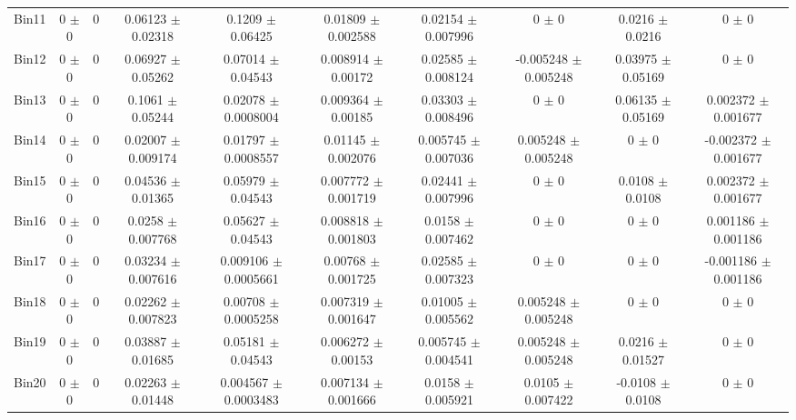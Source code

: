 \begin{tabular}{@{\extracolsep{4pt}}lccccccccc@{}}
     Bin11 & 0 $\pm$ 0 & 0 & 0.06123 $\pm$ 0.02318 & 0.1209 $\pm$ 0.06425 & 0.01809 $\pm$ 0.002588 & 0.02154 $\pm$ 0.007996 & 0 $\pm$ 0 & 0.0216 $\pm$ 0.0216 & 0 $\pm$ 0 \\ 
     Bin12 & 0 $\pm$ 0 & 0 & 0.06927 $\pm$ 0.05262 & 0.07014 $\pm$ 0.04543 & 0.008914 $\pm$ 0.00172 & 0.02585 $\pm$ 0.008124 & -0.005248 $\pm$ 0.005248 & 0.03975 $\pm$ 0.05169 & 0 $\pm$ 0 \\ 
     Bin13 & 0 $\pm$ 0 & 0 & 0.1061 $\pm$ 0.05244 & 0.02078 $\pm$ 0.0008004 & 0.009364 $\pm$ 0.00185 & 0.03303 $\pm$ 0.008496 & 0 $\pm$ 0 & 0.06135 $\pm$ 0.05169 & 0.002372 $\pm$ 0.001677 \\ 
     Bin14 & 0 $\pm$ 0 & 0 & 0.02007 $\pm$ 0.009174 & 0.01797 $\pm$ 0.0008557 & 0.01145 $\pm$ 0.002076 & 0.005745 $\pm$ 0.007036 & 0.005248 $\pm$ 0.005248 & 0 $\pm$ 0 & -0.002372 $\pm$ 0.001677 \\ 
     Bin15 & 0 $\pm$ 0 & 0 & 0.04536 $\pm$ 0.01365 & 0.05979 $\pm$ 0.04543 & 0.007772 $\pm$ 0.001719 & 0.02441 $\pm$ 0.007996 & 0 $\pm$ 0 & 0.0108 $\pm$ 0.0108 & 0.002372 $\pm$ 0.001677 \\ 
     Bin16 & 0 $\pm$ 0 & 0 & 0.0258 $\pm$ 0.007768 & 0.05627 $\pm$ 0.04543 & 0.008818 $\pm$ 0.001803 & 0.0158 $\pm$ 0.007462 & 0 $\pm$ 0 & 0 $\pm$ 0 & 0.001186 $\pm$ 0.001186 \\ 
     Bin17 & 0 $\pm$ 0 & 0 & 0.03234 $\pm$ 0.007616 & 0.009106 $\pm$ 0.0005661 & 0.00768 $\pm$ 0.001725 & 0.02585 $\pm$ 0.007323 & 0 $\pm$ 0 & 0 $\pm$ 0 & -0.001186 $\pm$ 0.001186 \\ 
     Bin18 & 0 $\pm$ 0 & 0 & 0.02262 $\pm$ 0.007823 & 0.00708 $\pm$ 0.0005258 & 0.007319 $\pm$ 0.001647 & 0.01005 $\pm$ 0.005562 & 0.005248 $\pm$ 0.005248 & 0 $\pm$ 0 & 0 $\pm$ 0 \\ 
     Bin19 & 0 $\pm$ 0 & 0 & 0.03887 $\pm$ 0.01685 & 0.05181 $\pm$ 0.04543 & 0.006272 $\pm$ 0.00153 & 0.005745 $\pm$ 0.004541 & 0.005248 $\pm$ 0.005248 & 0.0216 $\pm$ 0.01527 & 0 $\pm$ 0 \\ 
     Bin20 & 0 $\pm$ 0 & 0 & 0.02263 $\pm$ 0.01448 & 0.004567 $\pm$ 0.0003483 & 0.007134 $\pm$ 0.001666 & 0.0158 $\pm$ 0.005921 & 0.0105 $\pm$ 0.007422 & -0.0108 $\pm$ 0.0108 & 0 $\pm$ 0 \\ 
\hline\hline
  \end{tabular}
